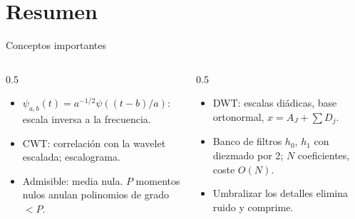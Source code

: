 \documentclass[aspectratio=169,11pt]{beamer}
\begin{document}
\section*{Resumen}
\begin{frame}{Conceptos importantes}
  \begin{columns}[T]
    \begin{column}{0.5\textwidth}
      \begin{itemize}
        \item $\psi_{a,b}(t)=a^{-1/2}\psi((t-b)/a)$: escala inversa a la frecuencia.
        \item CWT: correlación con la wavelet escalada; escalograma.
        \item Admisible: media nula. $P$ momentos nulos anulan polinomios de grado $<P$.
      \end{itemize}
    \end{column}
    \begin{column}{0.5\textwidth}
      \begin{itemize}
        \item DWT: escalas diádicas, base ortonormal, $x=A_J+\sum D_j$.
        \item Banco de filtros $h_0$, $h_1$ con diezmado por 2; $N$ coeficientes, coste $O(N)$.
        \item Umbralizar los detalles elimina ruido y comprime.
      \end{itemize}
    \end{column}
  \end{columns}
  \bigskip
\end{frame}
\end{document}
